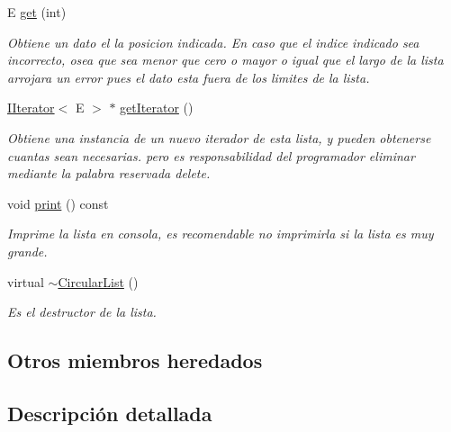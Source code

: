 \begin{DoxyCompactItemize}
E \hyperlink{classCircularList_ad6783339c7ff05841fc62f74f809644d}{get} (int)
\begin{DoxyCompactList}\small\item\em Obtiene un dato el la posicion indicada. En caso que el indice indicado sea incorrecto, osea que sea menor que cero o mayor o igual que el largo de la lista arrojara un error pues el dato esta fuera de los limites de la lista. \end{DoxyCompactList}\item 
\hyperlink{classIIterator}{I\-Iterator}$<$ E $>$ $\ast$ \hyperlink{classCircularList_a43e6cf1632001b3f409c6ce531529c6e}{get\-Iterator} ()
\begin{DoxyCompactList}\small\item\em Obtiene una instancia de un nuevo iterador de esta lista, y pueden obtenerse cuantas sean necesarias. pero es responsabilidad del programador eliminar mediante la palabra reservada delete. \end{DoxyCompactList}\item 
\hypertarget{classCircularList_ad49a3216e39d960d995fb93b87f18856}{void \hyperlink{classCircularList_ad49a3216e39d960d995fb93b87f18856}{print} () const }\label{classCircularList_ad49a3216e39d960d995fb93b87f18856}

\begin{DoxyCompactList}\small\item\em Imprime la lista en consola, es recomendable no imprimirla si la lista es muy grande. \end{DoxyCompactList}\item 
\hypertarget{classCircularList_aa65c9665b7d36a5e609752cad0a35dbb}{virtual \hyperlink{classCircularList_aa65c9665b7d36a5e609752cad0a35dbb}{$\sim$\-Circular\-List} ()}\label{classCircularList_aa65c9665b7d36a5e609752cad0a35dbb}

\begin{DoxyCompactList}\small\item\em Es el destructor de la lista. \end{DoxyCompactList}\end{DoxyCompactItemize}
\subsection*{Otros miembros heredados}


\subsection{Descripción detallada}
